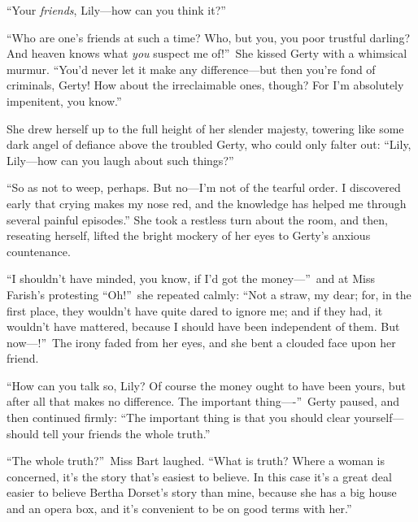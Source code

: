 \documentclass[12pt,a4paper]{book}
\begin{document}
``Your \textit{friends}, Lily---how can you think it?''





``Who are one's friends at such a time? Who, but you, you poor
trustful darling? And heaven knows what \textit{you} suspect me of!''\ She
kissed Gerty with a whimsical murmur. ``You'd never let it make
any difference---but then you're fond of criminals, Gerty! How
about the irreclaimable ones, though? For I'm absolutely
impenitent, you know.''





She drew herself up to the full height of her slender majesty,
towering like some dark angel of defiance above the troubled
Gerty, who could only falter out: ``Lily, Lily---how can you laugh
about such things?''





``So as not to weep, perhaps. But no---I'm not of the tearful
order. I discovered early that crying makes my nose red, and the
knowledge has helped me through several painful episodes.'' She
took a restless turn about the room, and then, reseating herself,
lifted the bright mockery of her eyes to Gerty's anxious
countenance.





``I shouldn't have minded, you know, if I'd got the money---''\ and
at Miss Farish's protesting ``Oh!''\ she repeated calmly: ``Not a
straw, my dear; for, in the first place, they wouldn't have quite
dared to ignore me; and if they had, it wouldn't have mattered,
because I should have been independent of them. But now---!''\ The
irony faded from her eyes, and she bent a clouded face upon her
friend.





``How can you talk so, Lily? Of course the money ought to have
been yours, but after all that makes no difference. The important
thing----''\ Gerty paused, and then continued firmly: ``The important
thing is that you should clear yourself---should tell your friends
the whole truth.''





``The whole truth?''\ Miss Bart laughed. ``What is truth? Where a
woman is concerned, it's the story that's easiest to believe. In
this case it's a great deal easier to believe Bertha Dorset's
story than mine, because she has a big house and an opera box,
and it's convenient to be on good terms with her.''
\end{document}
